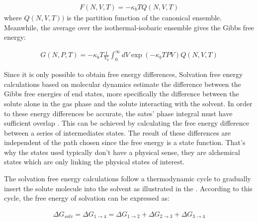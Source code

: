 \begin{equation}
\label{eq:fcano}
\begin{aligned}
F(N,V,T) = -\kappa_{b}TQ(N,V,T)
\end{aligned}
\end{equation}
where $Q(N,V,T))$ is the partition function of the canonical ensemble. Meanwhile, the average over the isothermal-isobaric ensemble gives the Gibbs free energy:

\begin{equation}
\label{eq:fisobari}
\begin{aligned}
G(N,P,T) = -\kappa_{b}T\frac{1}{V_{0}} \int_{0}^{\infty} dV \exp(-\kappa_{b}TPV)Q(N,V,T)
\end{aligned}
\end{equation}

Since it is only possible to obtain free energy differences, Solvation free energy calculations based on molecular dynamics estimate the difference between the Gibbs free energies of end states, more specifically the difference between the solute alone in the gas phase and the solute interacting with the solvent. In order to these energy differences be accurate, the sates' phase integral must have sufficient overlap  \cite{klimovich}. This can be achieved by calculating the free energy difference between a series of intermediates states. The result of these differences are independent of the path chosen since the free energy is a state function. That's why the states used typically don't have a physical sense, they are alchemical states which are only linking the physical states of interest.

The solvation free energy calculations follow a thermodynamic cycle to gradually insert the solute molecule into the solvent as illustrated in the . According to this cycle, the free energy of solvation can be expressed as:

\begin{equation}
\label{eq:freesolv}
\begin{aligned}
\Delta G_{solv} = \Delta G_{1 \rightarrow 4} = \Delta G_{1 \rightarrow 2} + \Delta G_{2 \rightarrow 3} + \Delta G_{3 \rightarrow 4}  
\end{aligned}
\end{equation}


